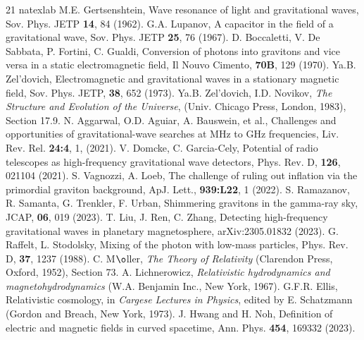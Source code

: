 \documentclass[twocolumn,amsmath,amssymb]{revtex4}
\begin{document}
%
%
\begin{thebibliography}{21}
\expandafter\ifx\csname natexlab\endcsname\relax\def\natexlab#1{#1}\fi
{}
         M.E. Gertsenshtein, Wave resonance of light and gravitational waves, Sov. Phys. JETP {\bf 14}, 84 (1962).
         G.A. Lupanov, A capacitor in the field of a gravitational wave, Sov. Phys. JETP {\bf 25}, 76 (1967).
         D. Boccaletti, V. De Sabbata, P. Fortini, C. Gualdi, Conversion of photons into gravitons and vice versa in a static electromagnetic field, Il Nouvo Cimento, {\bf 70B}, 129 (1970).
         Ya.B. Zel'dovich, Electromagnetic and gravitational waves in a stationary magnetic field, Sov. Phys. JETP, {\bf 38}, 652 (1973).
         Ya.B. Zel'dovich, I.D. Novikov, {\it The Structure and Evolution of the Universe}, (Univ. Chicago Press, London, 1983), Section 17.9.
         N. Aggarwal, O.D. Aguiar, A. Bauswein, et al., Challenges and opportunities of gravitational-wave searches at MHz to GHz frequencies, Liv. Rev. Rel. {\bf 24:4}, 1, (2021).
         V. Domcke, C. Garcia-Cely, Potential of radio telescopes as high-frequency gravitational wave detectors, Phys. Rev. D, {\bf 126}, 021104 (2021).
         S. Vagnozzi, A. Loeb, The challenge of ruling out inflation via the primordial graviton background, ApJ. Lett., {\bf 939:L22}, 1 (2022).
         S. Ramazanov, R. Samanta, G. Trenkler, F. Urban, Shimmering gravitons in the gamma-ray sky, JCAP, {\bf 06}, 019 (2023).
         T. Liu, J. Ren, C. Zhang, Detecting high-frequency gravitational waves in planetary magnetosphere, arXiv:2305.01832 (2023).
         G. Raffelt, L. Stodolsky, Mixing of the photon with low-mass particles, Phys. Rev. D, {\bf 37}, 1237 (1988).
         C. M$\o$ller, {\it The Theory of Relativity} (Clarendon Press, Oxford, 1952), Section 73.
         A. Lichnerowicz, {\it Relativistic hydrodynamics and magnetohydrodynamics} (W.A. Benjamin Inc., New York, 1967).
         G.F.R. Ellis, Relativistic cosmology, in {\it Cargese Lectures in Physics}, edited by E. Schatzmann (Gordon and Breach, New York, 1973).
         J. Hwang and H. Noh, Definition of electric and magnetic fields in curved spacetime, Ann. Phys. {\bf 454}, 169332 (2023).

\end{thebibliography}
\end{document}
